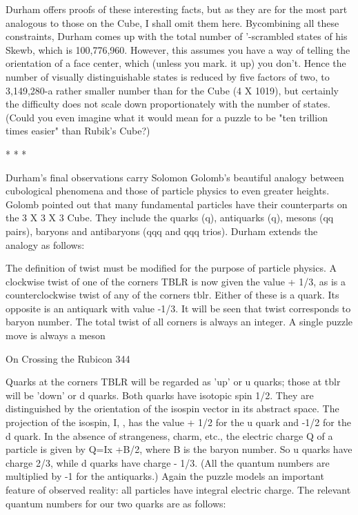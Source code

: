 Durham offers proofs of these interesting facts, but as they are for the most part
analogous to those on the Cube, I shall omit them here. Bycombining all these
constraints, Durham comes up with the total number of '-scrambled states of his
Skewb, which is 100,776,960. However, this assumes you have a way of telling the
orientation of a face center, which (unless you mark. it up) you don't. Hence the
number of visually distinguishable states is reduced by five factors of two, to
3,149,280-a rather smaller number than for the Cube (4 X 1019), but certainly the
difficulty does not scale down proportionately with the number of states. (Could
you even imagine what it would mean for a puzzle to be "ten trillion times easier"
than Rubik's Cube?)

                                     *   *   *

Durham's final observations carry Solomon Golomb's beautiful analogy between
cubological phenomena and those of particle physics to even greater heights.
Golomb pointed out that many fundamental particles have their counterparts on the
3 X 3 X 3 Cube. They include the quarks (q), antiquarks (q), mesons (qq pairs),
baryons and antibaryons (qqq and qqq trios). Durham extends the analogy as
follows:

     The definition of twist must be modified for the purpose of particle physics.
     A clockwise twist of one of the corners TBLR is now given the value + 1/3,
     as is a counterclockwise twist of any of the corners tblr. Either of these is a
     quark. Its opposite is an antiquark with value -1/3. It will be seen that twist
     corresponds to baryon number. The total twist of all corners is always an
     integer. A single puzzle move is always a meson




On Crossing the Rubicon                                                              344

     Quarks at the corners TBLR will be regarded as 'up' or u quarks; those at tblr
     will be 'down' or d quarks. Both quarks have isotopic spin 1/2. They are
     distinguished by the orientation of the isospin vector in its abstract space.
     The projection of the isospin, I, , has the value + 1/2 for the u quark and -1/2
     for the d quark. In the absence of strangeness, charm, etc., the electric charge
     Q of a particle is given by Q=Ix +B/2, where B is the baryon number. So u
     quarks have charge 2/3, while d quarks have charge - 1/3. (All the quantum
     numbers are multiplied by -1 for the antiquarks.) Again the puzzle models an
     important feature of observed reality: all particles have integral electric
     charge.
     The relevant quantum numbers for our two quarks are as follows:

